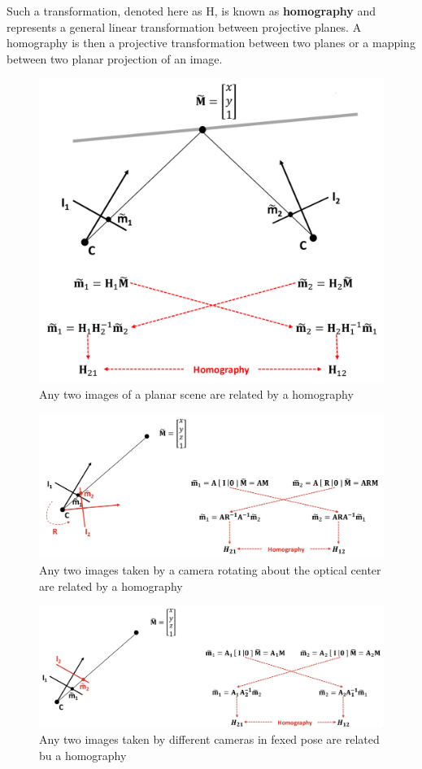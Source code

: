\documentclass{article}
\begin{document}
Such a transformation, denoted here as H, is known as \textbf{homography} and represents a general linear transformation between projective planes.
A homography is then a projective transformation between two planes or a mapping between two planar projection of an image.

\begin{figure}[htbp]
  \centering
  \includegraphics[width=0.6\linewidth]{./img/homography.jpg}
  \caption{Any two images of a planar scene are related by a homography}
  \label{fig:homography}
\end{figure}


\begin{figure}[htbp]
  \centering
  \includegraphics[width=0.8\linewidth]{./img/rotating_homography.jpg}
  \caption{Any two images taken by a camera rotating about the optical center are related by a homography}
  \label{fig:rotating_homography}
\end{figure}

\begin{figure}[htbp]
  \centering
  \includegraphics[width=0.8\linewidth]{./img/moving_homography.jpg}
  \caption{Any two images taken by different cameras in fexed pose are related bu a homography}
  \label{fig:moving_homography}
\end{figure}
\end{document}

